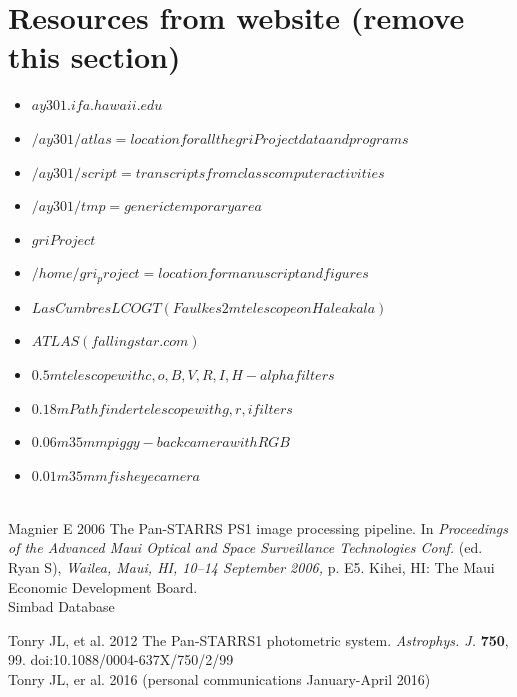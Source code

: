\documentclass[aps,prl,twocolumn,superscriptaddress]{revtex4-1}
\begin{document}
\section{Resources from website (remove this section)}
\begin{itemize}
	\item{} $ay301.ifa.hawaii.edu$
	\item{} $/ay301/atlas = location for all the gri Project data and programs$
	\item{} $/ay301/script = transcripts from class computer activities$
	\item{} $/ay301/tmp = generic temporary area$
	\item{} $gri Project$
	\item{} $/home/gri_project = location for manuscript and figures$
	\item{} $Las Cumbres LCOGT (Faulkes 2m telescope on Haleakala)$
	\item{} $ATLAS (fallingstar.com)$
	\item{} $0.5m telescope with c,o,B,V,R,I,H-alpha filters$
	\item{} $0.18m Pathfinder telescope with g,r,i filters$
	\item{} $0.06m 35mm piggy-back camera with RGB$
	\item{} $0.01m 35mm fisheye camera$
\end{itemize}



\setlength{\parindent}{0cm}

\begin{thebibliography}{99}  %

~\\%

 Magnier E 2006 The Pan-STARRS PS1 image processing pipeline. In \textit{Proceedings of the Advanced Maui Optical and Space Surveillance Technologies Conf.} (ed. Ryan S), \textit{Wailea, Maui, HI, 10–14 September 2006,} p. E5. Kihei, HI: The Maui Economic Development Board.\\

 Simbad Database

 Tonry JL, et al. 2012 The Pan-STARRS1 photometric system. \textit{Astrophys. J.} \textbf{750}, 99. doi:10.1088/0004-637X/750/2/99\\

 Tonry JL, er al. 2016 (personal communications January-April 2016)\\

\end{thebibliography}
\end{document}
